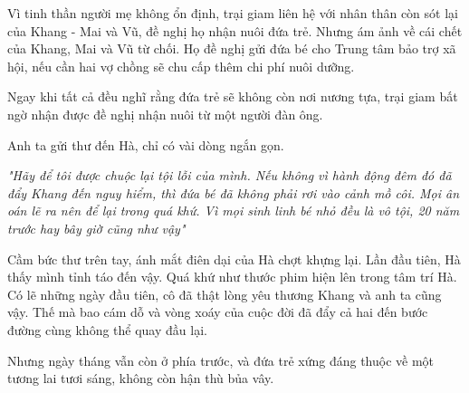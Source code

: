 \documentclass[12pt,a4paper]{article}
\begin{document}
Vì tinh thần người mẹ không ổn định, trại giam liên hệ với nhân thân còn sót lại của Khang - Mai và Vũ, đề nghị họ nhận nuôi đứa trẻ. Nhưng ám ảnh về cái chết của Khang, Mai và Vũ từ chối. Họ đề nghị gửi đứa bé cho Trung tâm bảo trợ xã hội, nếu cần hai vợ chồng sẽ chu cấp thêm chi phí nuôi dưỡng.


Ngay khi tất cả đều nghĩ rằng đứa trẻ sẽ không còn nơi nương tựa, trại giam bất ngờ nhận được đề nghị nhận nuôi từ một người đàn ông.


Anh ta gửi thư đến Hà, chỉ có vài dòng ngắn gọn.


\textit{"Hãy để tôi được chuộc lại tội lỗi của mình. Nếu không vì hành động đêm đó đã đẩy Khang đến nguy hiểm, thì đứa bé đã không phải rơi vào cảnh mồ côi. Mọi ân oán lẽ ra nên để lại trong quá khứ. Vì mọi sinh linh bé nhỏ đều là vô tội, 20 năm trước hay bây giờ cũng như vậy"}


Cầm bức thư trên tay, ánh mắt điên dại của Hà chợt khựng lại. Lần đầu tiên, Hà thấy mình tỉnh táo đến vậy. Quá khứ như thước phim hiện lên trong tâm trí Hà. Có lẽ những ngày đầu tiên, cô đã thật lòng yêu thương Khang và anh ta cũng vậy. Thế mà bao cám dỗ và vòng xoáy của cuộc đời đã đẩy cả hai đến bước đường cùng không thể quay đầu lại.


Nhưng ngày tháng vẫn còn ở phía trước, và đứa trẻ xứng đáng thuộc về một tương lai tươi sáng, không còn hận thù bủa vây.
\end{document}
